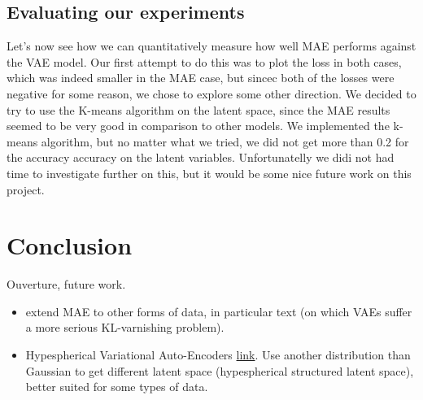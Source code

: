 \documentclass{article} %
\begin{document}
\subsection{Evaluating our experiments}
Let's now see how we can quantitatively measure how well MAE performs against
the VAE model. Our first attempt to do this was to plot the loss in both cases,
which was indeed smaller in the MAE case, but sincec both of the losses were
negative for some reason, we chose to explore some other direction. We decided
to try to use the K-means algorithm on the latent space, since the MAE results
seemed to be very good in comparison to other models. We implemented the
k-means algorithm, but no matter what we tried, we did not get more than 0.2 for
the accuracy accuracy on the latent variables. Unfortunatelly we didi not had
time to investigate further on this, but it would be some nice future work on
this project.


\section {Conclusion}
Ouverture, future work.
\begin{itemize}
\item extend MAE to other forms of data, in particular text (on which VAEs
  suffer a more serious KL-varnishing problem).
\item Hypespherical Variational Auto-Encoders
  \href{https://arxiv.org/pdf/1804.00891.pdf}{link}. Use another distribution
  than Gaussian to get different latent space (hypespherical structured latent
  space), better suited for some types of data.
\end{itemize}


\nocite{*}


\end{document}
